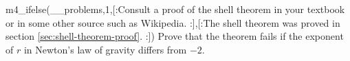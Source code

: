 m4_ifelse(__problems,1,[:Consult a proof of the shell theorem in your textbook or in some other source
such as Wikipedia.%
:],[:The shell theorem was proved in section \ref{sec:shell-theorem-proof}.%
:])%
Prove that the theorem  fails if the exponent of $r$ in Newton's law of gravity differs from $-2$.
